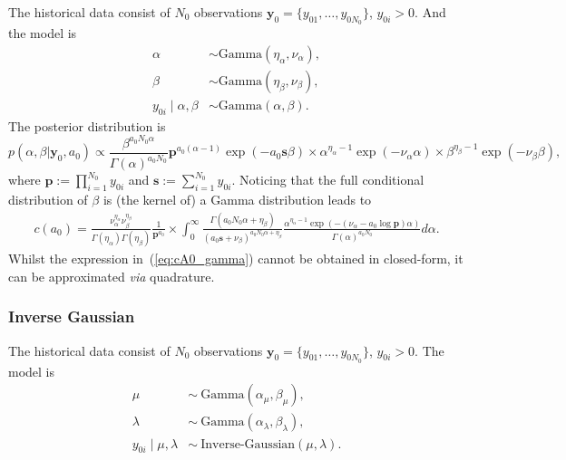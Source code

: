 \documentclass[a4paper, notitlepage, 11pt]{article}
\begin{document}
The historical data consist of $N_0$ observations $\boldsymbol y_0 =\{y_{01}, \ldots , y_{0N_0}\}$, $y_{0i} > 0$.
And the model is
\begin{align*}
 \alpha &\sim \text{Gamma}(\eta_\alpha, \nu_\alpha), \\
 \beta &\sim \text{Gamma}(\eta_\beta, \nu_\beta), \\
 y_{0i} \mid \alpha, \beta &\sim \text{Gamma}(\alpha, \beta).
\end{align*}
The posterior distribution is 
\begin{equation}
 \label{eq:posterior_gamma}
 p(\alpha, \beta | \boldsymbol y_{0}, a_0) \propto \frac{\beta^{a_0N_0\alpha}}{\Gamma(\alpha)^{a_0N_0}} \boldsymbol p^{a_0(\alpha-1)} \exp(-a_0\boldsymbol s\beta) \times  \alpha^{\eta_\alpha -1} \exp(-\nu_\alpha \alpha) \times \beta^{\eta_\beta -1} \exp(-\nu_\beta \beta),
\end{equation}
where $\boldsymbol p := \prod_{i =1}^{N_0} y_{0i}$ and $\boldsymbol s := \sum_{i =1}^{N_0} y_{0i}$.
Noticing that the full conditional distribution of $\beta$ is (the kernel of) a Gamma distribution leads to
\begin{align}
 \label{eq:cA0_gamma}
 c(a_0) = \frac{\nu_\alpha^{\eta_\alpha}\nu_\beta^{\eta_\beta}}{\Gamma(\eta_\alpha)\Gamma(\eta_\beta)} \frac{1}{\boldsymbol p^{a_0} } \times \int_0^\infty \frac{\Gamma(a_0N_0\alpha + \eta_\beta)}{\left( a_0\boldsymbol s + \nu_\beta \right)^{a_0N_0\alpha + \eta_\beta}} \frac{\alpha^{\eta_\alpha -1} \exp(- ( \nu_\alpha - a_0 \log \boldsymbol p) \alpha)}{\Gamma(\alpha)^{a_0 N_0}} d\alpha.
\end{align}
Whilst the expression in~(\ref{eq:cA0_gamma}) cannot be obtained in closed-form, it can be approximated \textit{via} quadrature.


\subsubsection{Inverse Gaussian}

The historical data consist of $N_0$ observations $\boldsymbol y_0 =\{y_{01}, \ldots , y_{0N_0}\}$, $y_{0i} > 0$.
The model is
\begin{align*}
 \mu & \sim~\text{Gamma}(\alpha_\mu, \beta_\mu),\\
 \lambda & \sim~\text{Gamma}(\alpha_\lambda, \beta_\lambda),\\
 y_{0i} \mid \mu, \lambda &\sim~\text{Inverse-Gaussian}(\mu, \lambda).
\end{align*}
\end{document}

